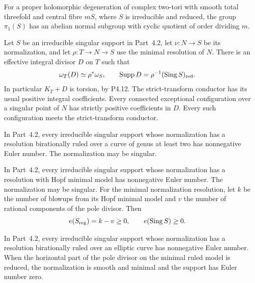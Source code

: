 \begin{proposition}[P4R.1]\hypertarget{tag-02Y2}{}\label{night:P4R.1}\label{stmt:P4R.1}


For a proper holomorphic degeneration of complex two-tori with
smooth total threefold and central fibre $mS$, where $S$ is
irreducible and reduced, the group $\pi_1(S)$ has an abelian
normal subgroup with cyclic quotient of order dividing $m$.
\end{proposition}

\begin{proposition}[P4R.6]\hypertarget{tag-02YI}{}\label{night:P4R.6}\label{stmt:P4R.6}


Let $S$ be an irreducible singular support in
Part~4.2, let $\nu:N\to S$ be its normalization,
and let $\rho:T\to N\to S$ use the minimal
resolution of $N$. There is an effective integral
divisor $D$ on $T$ such that
\[
 \omega_T(D)\simeq\rho^*\omega_S,
 \qquad \operatorname{Supp}D
       =\rho^{-1}(\operatorname{Sing}S)_{\rm red}.
\]
In particular $K_T+D$ is torsion, by P4.12.
The strict-transform conductor has its usual
positive integral coefficients. Every connected
exceptional configuration over a singular point
of $N$ has strictly positive coefficients in $D$.
Every such configuration meets the strict-transform
conductor.
\end{proposition}

\begin{proposition}[P4R.7]\hypertarget{tag-02YJ}{}\label{night:P4R.7}\label{stmt:P4R.7}


In Part~4.2, every irreducible singular
support whose normalization has a
resolution birationally ruled over a
curve of genus at least two has
nonnegative Euler number. The
normalization may be singular.
\end{proposition}

\begin{proposition}[P4R.8]\hypertarget{tag-02YK}{}\label{night:P4R.8}\label{stmt:P4R.8}


In Part~4.2, every irreducible singular support
whose normalization has a resolution with Hopf
minimal model has nonnegative Euler number.
The normalization may be singular. For the
minimal normalization resolution, let $k$ be
the number of blowups from its Hopf minimal
model and $v$ the number of rational components
of the pole divisor. Then
\[
 e(S_{\rm reg})=k-v\ge0,\qquad
 e(\operatorname{Sing}S)\ge0.
\]
\end{proposition}

\begin{proposition}[P4R.9]\hypertarget{tag-02YL}{}\label{night:P4R.9}\label{stmt:P4R.9}


In Part~4.2, every irreducible singular
support whose normalization has a
resolution birationally ruled over an
elliptic curve has nonnegative Euler
number. When the horizontal part of
the pole divisor on the minimal ruled
model is reduced, the normalization
is smooth and minimal and the support
has Euler number zero.
\end{proposition}

